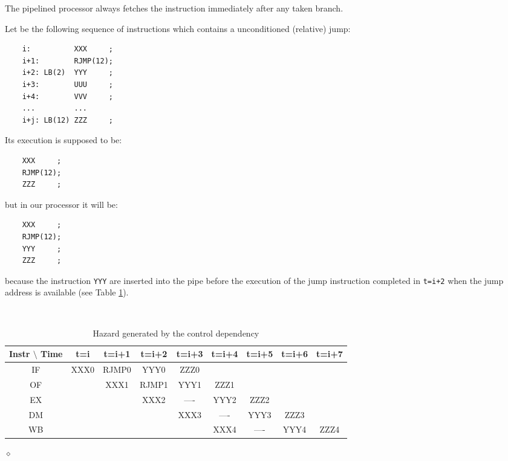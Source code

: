 The pipelined processor always fetches the instruction immediately after any taken branch.

\begin{exemplu}\label{controlDep}
Let be the following sequence of instructions which contains a unconditioned (relative) jump:
\begin{verbatim}
    i:          XXX     ;
    i+1:        RJMP(12);
    i+2: LB(2)  YYY     ;
    i+3:        UUU     ;
    i+4:        VVV     ;
    ...         ...
    i+j: LB(12) ZZZ     ;
\end{verbatim}
Its execution is supposed to be:
\begin{verbatim}
    XXX     ;
    RJMP(12);
    ZZZ     ;
\end{verbatim}
but in our processor it will be:
\begin{verbatim}
    XXX     ;
    RJMP(12);
    YYY     ;
    ZZZ     ;
\end{verbatim}
because the instruction {\tt YYY} are inserted into the pipe before the execution of the jump instruction completed in {\tt t=i+2} when the jump address is available  (see Table \ref{contrDep}).

\begin{table}[H]
  \begin{center}
    \caption{Hazard generated by the control dependency}
    \label{contrDep}
    {\small
    {\tt
    \begin{tabular}{|c||c|c|c|c|c|c|c|c|}
      \hline
     Instr $\setminus$ Time & t=i  & t=i+1 & t=i+2 & t=i+3 & t=i+4 & t=i+5 & t=i+6 & t=i+7  \\ \hline \hline
        IF                  & XXX0 & RJMP0 & YYY0  & ZZZ0  &       &       &       &        \\ \hline
        OF                  &      & XXX1  & RJMP1 & YYY1  & ZZZ1  &       &       &        \\ \hline
        EX                  &      &       & XXX2  & ---- & YYY2   & ZZZ2  &       &        \\ \hline
        DM                  &       &       &      & XXX3  & ----  & YYY3  & ZZZ3  &        \\ \hline
        WB                  &      &       &       &       & XXX4  & ----  & YYY4  & ZZZ4   \\ \hline
    \end{tabular}
    }
    }
  \end{center}
\end{table}

$\diamond$
\end{exemplu}


